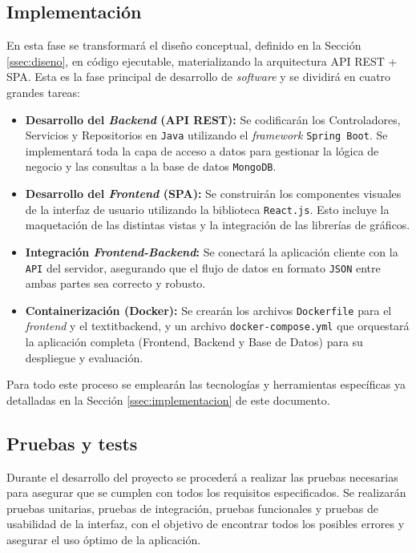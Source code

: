 \subsection{Implementación}

En esta fase se transformará el diseño conceptual, definido en la Sección \ref{ssec:diseno}, en código ejecutable, materializando la arquitectura API REST + SPA. Esta es la fase principal de desarrollo de \textit{software} y se dividirá en cuatro grandes tareas:

\begin{itemize}
    \item \textbf{Desarrollo del \textit{Backend} (API REST):} Se codificarán los Controladores, Servicios y Repositorios en \texttt{Java} utilizando el \textit{framework} \texttt{Spring Boot}. Se implementará toda la capa de acceso a datos para gestionar la lógica de negocio y las consultas a la base de datos \texttt{MongoDB}.
    
    \item \textbf{Desarrollo del \textit{Frontend} (SPA):} Se construirán los componentes visuales de la interfaz de usuario utilizando la biblioteca \texttt{React.js}. Esto incluye la maquetación de las distintas vistas y la integración de las librerías 
    de gráficos.
    
    \item \textbf{Integración \textit{Frontend-Backend}:} Se conectará la aplicación cliente con la \texttt{API} del servidor, asegurando que el flujo de datos en formato \texttt{JSON} entre ambas partes sea correcto y robusto.

    \item \textbf{Containerización (Docker):} Se crearán los archivos \texttt{Dockerfile} para el \textit{frontend} y el textit{backend}, y un archivo \texttt{docker-compose.yml} que orquestará la aplicación completa (Frontend, Backend y Base de Datos) para su despliegue y evaluación.
\end{itemize}

Para todo este proceso se emplearán las tecnologías y herramientas específicas ya detalladas en la Sección \ref{ssec:implementacion} de este documento.

\vspace{-0.3cm}

\subsection{Pruebas y tests}
\vspace{-0.05cm}
Durante el desarrollo del proyecto se procederá a realizar las pruebas necesarias para asegurar que se cumplen con todos los requisitos especificados. Se realizarán pruebas unitarias, pruebas de integración, pruebas funcionales y pruebas de usabilidad de la interfaz, con el objetivo de encontrar todos los posibles errores y asegurar el uso óptimo de la aplicación.

